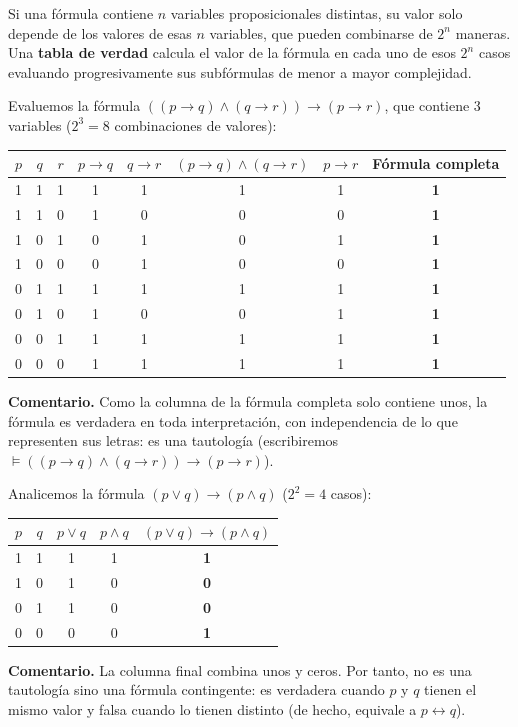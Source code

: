 Si una fórmula contiene $n$ variables proposicionales distintas, su valor solo depende de los valores de esas $n$ variables, que pueden combinarse de $2^n$ maneras. Una \textbf{tabla de verdad} calcula el valor de la fórmula en cada uno de esos $2^n$ casos evaluando progresivamente sus subfórmulas de menor a mayor complejidad.

\begin{ejemplo}
Evaluemos la fórmula $((p \to q) \land (q \to r)) \to (p \to r)$, que contiene 3 variables ($2^3 = 8$ combinaciones de valores):
\begin{center}
\small
\begin{tabular}{ccc|c|c|c|c|c}
$p$ & $q$ & $r$ & $p \to q$ & $q \to r$ & $(p \to q) \land (q \to r)$ & $p \to r$ & Fórmula completa \\
\hline
1 & 1 & 1 & 1 & 1 & 1 & 1 & \textbf{1} \\
1 & 1 & 0 & 1 & 0 & 0 & 0 & \textbf{1} \\
1 & 0 & 1 & 0 & 1 & 0 & 1 & \textbf{1} \\
1 & 0 & 0 & 0 & 1 & 0 & 0 & \textbf{1} \\
0 & 1 & 1 & 1 & 1 & 1 & 1 & \textbf{1} \\
0 & 1 & 0 & 1 & 0 & 0 & 1 & \textbf{1} \\
0 & 0 & 1 & 1 & 1 & 1 & 1 & \textbf{1} \\
0 & 0 & 0 & 1 & 1 & 1 & 1 & \textbf{1}
\end{tabular}
\end{center}
\textbf{Comentario.} Como la columna de la fórmula
completa solo contiene unos, la
fórmula es verdadera en toda interpretación, con independencia de lo
que representen sus letras: es una tautología (escribiremos $\models ((p \to q) \land (q \to
r)) \to (p \to r)$). 
\end{ejemplo}

\begin{ejemplo}
Analicemos la fórmula $(p \lor q) \to (p \land q)$ ($2^2 = 4$ casos):
\begin{center}
\begin{tabular}{cc|c|c|c}
$p$ & $q$ & $p \lor q$ & $p \land q$ & $(p \lor q) \to (p \land q)$ \\
\hline
1 & 1 & 1 & 1 & \textbf{1} \\
1 & 0 & 1 & 0 & \textbf{0} \\
0 & 1 & 1 & 0 & \textbf{0} \\
0 & 0 & 0 & 0 & \textbf{1}
\end{tabular}
\end{center}
\textbf{Comentario.} La columna final combina unos y ceros. Por tanto, no es una tautología sino una fórmula contingente: es verdadera cuando $p$ y $q$ tienen el mismo valor y falsa cuando lo tienen distinto (de hecho, equivale a $p \leftrightarrow q$).
\end{ejemplo}

